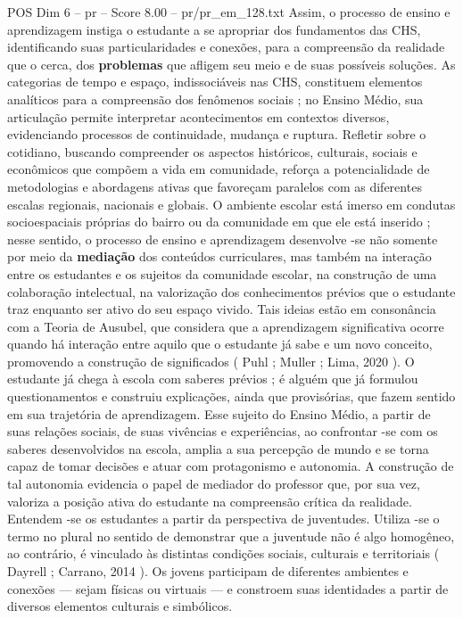 \begin{textsample}{POS Dim 6 – pr – Score 8.00 – pr/pr\_em\_128.txt}
Assim, o processo de ensino e aprendizagem instiga o estudante a se apropriar dos fundamentos das CHS, identificando suas particularidades e conexões, para a compreensão da realidade que o cerca, dos \textbf{problemas} que afligem seu meio e de suas possíveis soluções.
As categorias de tempo e espaço, indissociáveis nas CHS, constituem elementos analíticos para a compreensão dos fenômenos sociais ; no Ensino Médio, sua articulação permite interpretar acontecimentos em contextos diversos, evidenciando processos de continuidade, mudança e ruptura.
Refletir sobre o cotidiano, buscando compreender os aspectos históricos, culturais, sociais e econômicos que compõem a vida em comunidade, reforça a potencialidade de metodologias e abordagens ativas que favoreçam paralelos com as diferentes escalas regionais, nacionais e globais.
O ambiente escolar está imerso em condutas socioespaciais próprias do bairro ou da comunidade em que ele está inserido ; nesse sentido, o processo de ensino e aprendizagem desenvolve -se não somente por meio da \textbf{mediação} dos conteúdos curriculares, mas também na interação entre os estudantes e os sujeitos da comunidade escolar, na construção de uma colaboração intelectual, na valorização dos conhecimentos prévios que o estudante traz enquanto ser ativo do seu espaço vivido.
Tais ideias estão em consonância com a Teoria de Ausubel, que considera que a aprendizagem significativa ocorre quando há interação entre aquilo que o estudante já sabe e um novo conceito, promovendo a construção de significados ( Puhl ; Muller ; Lima, 2020 ).
O estudante já chega à escola com saberes prévios ; é alguém que já formulou questionamentos e construiu explicações, ainda que provisórias, que fazem sentido em sua trajetória de aprendizagem.
Esse sujeito do Ensino Médio, a partir de suas relações sociais, de suas vivências e experiências, ao confrontar -se com os saberes desenvolvidos na escola, amplia a sua percepção de mundo e se torna capaz de tomar decisões e atuar com protagonismo e autonomia.
A construção de tal autonomia evidencia o papel de mediador do professor que, por sua vez, valoriza a posição ativa do estudante na compreensão crítica da realidade.
Entendem -se os estudantes a partir da perspectiva de juventudes.
Utiliza -se o termo no plural no sentido de demonstrar que a juventude não é algo homogêneo, ao contrário, é vinculado às distintas condições sociais, culturais e territoriais ( Dayrell ; Carrano, 2014 ).
Os jovens participam de diferentes ambientes e conexões — sejam físicas ou virtuais — e constroem suas identidades a partir de diversos elementos culturais e simbólicos.

\end{textsample}
